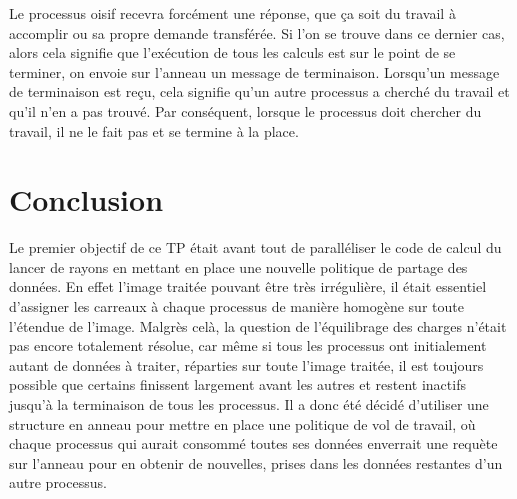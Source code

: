 \documentclass[a4paper,11pt]{article}
\begin{document}
Le processus oisif recevra forcément une réponse, que ça soit du travail à accomplir ou sa propre demande transférée. Si l'on se trouve dans ce dernier cas, alors cela signifie que l'exécution de tous les calculs est sur le point de se terminer, on envoie sur l'anneau un message de terminaison. Lorsqu'un message de terminaison est reçu, cela signifie qu'un autre processus a cherché du travail et qu'il n'en a pas trouvé. Par conséquent, lorsque le processus doit chercher du travail, il ne le fait pas et se termine à la place.


\section{Conclusion}
Le premier objectif de ce TP était avant tout de paralléliser le code de calcul du lancer de rayons en mettant en place une nouvelle politique de partage des données. En effet l'image traitée pouvant être très irrégulière, il était essentiel d'assigner les carreaux à chaque processus de manière homogène sur toute l'étendue de l'image. Malgrès celà, la question de l'équilibrage des charges n'était pas encore totalement résolue, car même si tous les processus ont initialement autant de données à traiter, réparties sur toute l'image traitée, il est toujours possible que certains finissent largement avant les autres et restent inactifs jusqu'à la terminaison de tous les processus.  Il a donc été décidé d'utiliser une structure en anneau pour mettre en place une politique de vol de travail, où chaque processus qui aurait consommé toutes ses données enverrait une requète sur l'anneau pour en obtenir de nouvelles, prises dans les données restantes d'un autre processus. %
\end{document}
